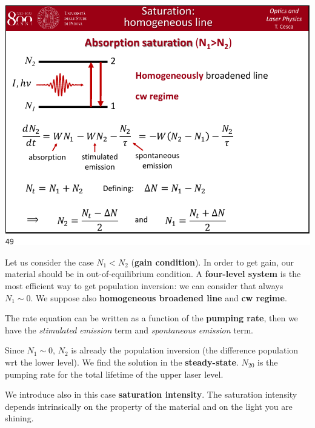\documentclass[../main/main.tex]{subfiles}
\begin{document}
\begin{minipage}[]{0.5\linewidth}
\centering
\includegraphics[page=11,width=1\textwidth]{../lessons/pdf_file/10_lecture.pdf}
\end{minipage}
\hspace{0.3cm}\vspace{0.3cm}
\begin{minipage}[c]{0.47\linewidth}

Let us consider the case \( N_1 < N_2 \) (\textbf{gain condition}).
In order to get gain, our material should be in out-of-equilibrium condition.
A \textbf{four-level system} is the most efficient way to get population inversion: we can consider that always \( N_1 \sim 0 \).
We suppose also \textbf{homogeneous broadened line} and \textbf{cw regime}.

The rate equation can be written as a function of the \textbf{pumping rate}, then we have the \emph{stimulated emission} term and \emph{spontaneous emission} term.

Since \( N_1 \sim 0 \), \( N_2 \) is already the population inversion (the difference population wrt the lower level). We find the solution in the \textbf{steady-state}. \( N_{20}  \) is the pumping rate for the total lifetime of the upper laser level.

We introduce also in this case \textbf{saturation intensity}. The saturation intensity depends intrinsically on the property of the material and on the light you are shining.


\end{minipage}
\end{document}
